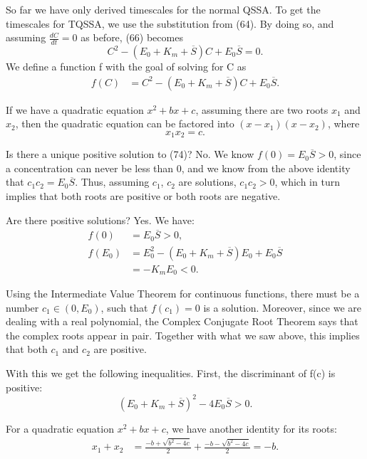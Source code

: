 \documentclass[12pt]{article}
\begin{document}
So far we have only derived timescales for the normal QSSA. To get the
timescales for TQSSA, we use the substitution from (64). By doing so,
and assuming $\frac{dC}{dt}=0$ as before, (66) becomes
\begin{equation}
  C^2 - (E_0 + K_m + \overline{S})C + E_0 \overline{S} = 0.
\end{equation}
We define a function f with the goal of solving for C as
\begin{align}
  f(C) &= C^2 - (E_0 + K_m + \overline{S})C + E_0 \overline{S}.
\end{align}

If we have a quadratic equation $x^2+bx+c$, assuming there are two
roots $x_1$ and $x_2$, then the quadratic equation can be factored
into $(x - x_1)(x - x_2)$, where
\begin{equation}
  x_1 x_2 = c.
\end{equation}

Is there a unique positive solution to (74)? No. We know
$f(0) = E_0 \overline{S} > 0$, since a concentration can never be less
than 0, and we know from the above identity that
$c_1 c_2 = E_0 \overline{S}$. Thus, assuming $c_1$, $c_2$ are
solutions, $c_1 c_2 > 0$, which in turn implies that both roots are
positive or both roots are negative.

Are there positive solutions? Yes. We have:
\begin{align}
  f(0) &= E_0 \overline{S} > 0, \\
  f(E_0) &= E_0^2 - (E_0 + K_m + \overline{S})E_0 + E_0 \overline{S} \\
         &= - K_m E_0 < 0.
\end{align}

Using the Intermediate Value Theorem for continuous functions, there
must be a number $c_1 \in (0,E_0)$, such that $f(c_1) = 0$ is a
solution. Moreover, since we are dealing with a real polynomial, the
Complex Conjugate Root Theorem says that the complex roots appear in
pair. Together with what we saw above, this implies that both $c_1$
and $c_2$ are positive.

With this we get the following inequalities. First, the discriminant
of f(c) is positive:
\begin{equation}
  (E_0 + K_m + \overline{S})^2 - 4 E_0 \overline{S} > 0.
\end{equation}

For a quadratic equation $x^2 + bx + c$, we have another identity for
its roots:
\begin{align}
  x_1 + x_2 &= \frac{-b + \sqrt{b^2-4c}}{2} + \frac{-b - \sqrt{b^2-4c}}{2} = -b.
\end{align}
\end{document}
